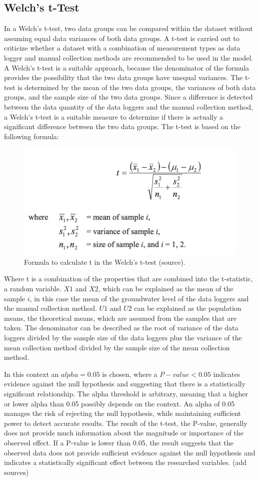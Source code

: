 \subsection{Welch's t-Test}
In a Welch’s t-test, two data groups can be compared within the dataset without assuming equal data variances of both data groups. A t-test is carried out to criticize whether a dataset with a combination of measurement types as data logger and manual collection methods are recommended to be used in the model. A Welch’s t-test is a suitable approach, because the denominator of the formula provides the possibility that the two data groups have unequal variances. The t-test is determined by the mean of the two data groups, the variances of both data groups, and the sample size of the two data groups. Since a difference is detected between the data quantity of the data loggers and the manual collection method, a Welch’s t-test is a suitable measure to determine if there is actually a significant difference between the two data groups. The t-test is based on the following formula: 
\begin{figure}[htbp]
    \centering
    \includegraphics[width=0.5\linewidth]{appendix/welch.png}
    \caption{Formula to calculate t in the Welch's t-test (source).}
    \label{T-test}
\end{figure}
Where t is a combination of the properties that are combined into the t-statistic, a random variable. \(X1\) and \(X2\), which can be explained as the mean of the sample \(i\), in this case the mean of the groundwater level of the data loggers and the manual collection method. \(U1\) and \(U2\) can be explained as the population means, the theoretical means, which are assumed from the samples that are taken. The denominator can be described as the root of variance of the data loggers divided by the sample size of the data loggers plus the variance of the mean collection method divided by the sample size of the mean collection method. 

In this context an \(alpha = 0.05\) is chosen, where a \(P-value < 0.05\) indicates evidence against the null hypothesis and suggesting that there is a statistically significant relationship. The alpha threshold is arbitrary, meaning that a higher or lower alpha than 0.05 possibly depends on the context. An alpha of 0.05 manages the risk of rejecting the null hypothesis, while maintaining sufficient power to detect accurate results. The result of the t-test, the P-value, generally does not provide much information about the magnitude or importance of the observed effect. If a P-value is lower than 0.05, the result suggests that the observed data does not provide sufficient evidence against the null hypothesis and indicates a statistically significant effect between the researched variables. (add sources)
 

